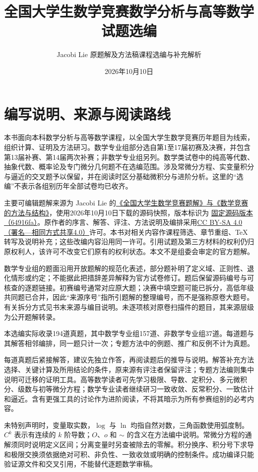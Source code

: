 \documentclass[12pt,fontset=fandol]{ctexart}
\title{全国大学生数学竞赛数学分析与高等数学试题选编}
\author{Jacobi Lie 原题解及方法稿\quad 课程选编与补充解析}
\date{2026年10月10日}
\begin{document}
\maketitle

\section*{编写说明、来源与阅读路线}
本书面向本科数学分析与高等数学课程，以全国大学生数学竞赛历年题目为线索，组织计算、证明及方法研习。数学专业组部分选自第1至17届初赛及决赛，并包含第13届补赛、第14届两次补赛；非数学专业组另列。数学类试卷中的纯高等代数、抽象代数、概率论及专门微分几何题不在选编范围。涉及常微分方程、实变量积分与逼近的交叉题予以保留，并在阅读时区分基础微积分与进阶分析。这里的“选编”不表示各组别历年全部试卷均已收齐。

主要可编辑题解来源为 Jacobi Lie 的\href{https://github.com/lzxcr/cmc-mathematics}{《全国大学生数学竞赛题解》与《数学竞赛的方法与结构》}，使用2026年10月10日下载的源码快照，版本标识为 \href{https://github.com/lzxcr/cmc-mathematics/tree/64916fa1fdbc3e444a652eca204d5669058ee321}{固定源码版本（64916fa）}。原作者的序言、解答、评注、方法说明及编排采用\href{https://creativecommons.org/licenses/by-sa/4.0/}{CC BY-SA 4.0（署名—相同方式共享4.0）}许可。本书对相关内容作课程筛选、章节重组、TeX 转写及说明补充；这些改编内容沿用同一许可。引用试题及第三方材料的权利仍归原权利人，该许可不改变它们原有的权利状态。本文不是组委会审定的官方题解。

数学专业组的题面沿用开放题解的规范化表述，部分题补明了定义域、正则性、退化情形或约定；不能据此把措辞差异解释为官方试卷修订。题后保留源码编号与可核查的逐题链接。初赛编号通常对应原大题；决赛中填空题可能已拆分，高低年级共同题已合并，因此“来源序号”指所引题解的整理编号，而不是强称原卷大题号。有关拆分方式见书末来源与编目说明。未逐项核对原卷扫描件的题目，其来源层级为公开题解转录。

本选编实际收录194道真题，其中数学专业组157道、非数学专业组37道。每道题与其解答相邻编排，同一题只计一次；专题方法中的例题、推广和反例不计为真题。

每道真题后紧接解答，建议先独立作答，再阅读题后的推导与说明。解答补充方法选择、关键计算及所用结论的条件，原来源有评注者保留评注；专题方法编则集中说明可迁移的证明工具。高等数学读者可先学习极限、导数、定积分、多元微积分、级数与初等微分方程；数学专业读者继续研习一致收敛、反常积分、一致估计和逼近。含有更强工具的讨论作为进阶阅读，不将其暗示为所有参赛组别的必考内容。

未特别声明时，变量取实数，$\log$ 与 $\ln$ 均指自然对数，三角函数使用弧度制。$C^k$ 表示有连续的 $k$ 阶导数；$O$、$o$ 和 $\sim$ 的含义在方法编中说明。常微分方程的通解须同时说明定义区间；分离变量时另查被除去的零解。积分换序、积分号下求导和极限交换须依据绝对可积、非负性、一致收敛或明确的控制条件。成功编译只能验证源文件和交叉引用，不能替代逐题数学审稿。
\tableofcontents
\clearpage
\end{document}
